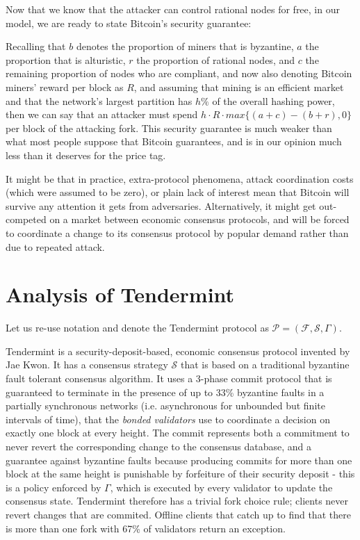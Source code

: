 \documentclass[11pt,a4paper]{article}
\theoremstyle{plain}
\theoremstyle{definition}
\begin{document}
Now that we know that the attacker can control rational nodes for free, in our model, we are ready to state Bitcoin's security guarantee:

Recalling that $b$ denotes the proportion of miners that is byzantine, $a$ the proportion that is alturistic, $r$ the proportion of rational nodes, and $c$ the remaining proportion of nodes who are compliant, and now also denoting Bitcoin miners' reward per block as $R$, and assuming that mining is an efficient market and that the network's largest partition has $h\%$ of the overall hashing power, then we can say that an attacker must spend $h \cdot R \cdot max\{(a + c) - (b + r),0\}$ per block of the attacking fork. This security guarantee is much weaker than what most people suppose that Bitcoin guarantees, and is in our opinion much less than it deserves for the price tag. 

It might be that in practice, extra-protocol phenomena, attack coordination costs (which were assumed to be zero), or plain lack of interest mean that Bitcoin will survive any attention it gets from adversaries. Alternatively, it might get out-competed on a market between economic consensus protocols, and will be forced to coordinate a change to its consensus protocol by popular demand rather than due to repeated attack. 

\section{Analysis of Tendermint}

Let us re-use notation and denote the Tendermint protocol as $\mathcal{P} = (\mathcal{F}, \mathcal{S}, \Gamma)$. 

Tendermint is a security-deposit-based, economic consensus protocol invented by Jae Kwon\cite{Tendermint}. It has a consensus strategy $\mathcal{S}$ that is based on a traditional byzantine fault tolerant consensus algorithm. It uses a 3-phase commit protocol that is guaranteed to terminate in the presence of up to 33\% byzantine faults in a partially synchronous networks (i.e. asynchronous for unbounded but finite intervals of time), that the \emph{bonded validators} use to coordinate a decision on exactly one block at every height. The commit represents both a commitment to never revert the corresponding change to the consensus database, and a guarantee against byzantine faults because producing commits for more than one block at the same height is punishable by forfeiture of their security deposit - this is a policy enforced by $\Gamma$, which is executed by every validator to update the consensus state. Tendermint therefore has a trivial fork choice rule; clients never revert changes that are commited. Offline clients that catch up to find that there is more than one fork with 67\% of validators return an exception.
\end{document}
